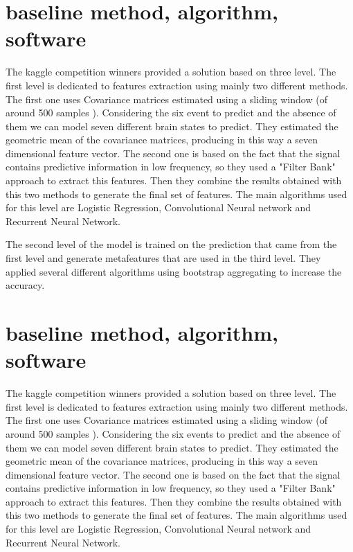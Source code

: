 \documentclass[final,leqno,onefignum,onetabnum]{siamltexmm}
\begin{document}
  \section{baseline method, algorithm, software}
  The kaggle competition winners \cite{kaggle} provided a solution based on three level. The first level is dedicated to features extraction using mainly two different methods. The first one uses Covariance matrices  estimated using a sliding window (of around 500 samples ). Considering the six event to predict and the absence of them we can model seven different brain states to predict. They estimated the geometric mean of the covariance matrices, producing in this way a seven dimensional feature vector. The second one is based on the fact that the signal contains predictive information in low frequency, so they used a  "Filter Bank" approach to extract this features. Then they combine the results obtained with this two methods to generate the final set of features. 
  The main algorithms used for this level are Logistic Regression, Convolutional Neural network and Recurrent Neural Network. 

  The second level of the model is trained on the prediction that came from the first level and generate metafeatures that are used in the third level. They applied several different algorithms using bootstrap aggregating to increase the accuracy.

\section{baseline method, algorithm, software}
The kaggle competition winners \cite{kaggle} provided a solution based on three level. The first level is dedicated to features extraction using mainly two different methods. The first one uses Covariance matrices  estimated using a sliding window (of around 500 samples ). Considering the six events to predict and the absence of them we can model seven different brain states to predict. They estimated the geometric mean of the covariance matrices, producing in this way a seven dimensional feature vector. The second one is based on the fact that the signal contains predictive information in low frequency, so they used a  "Filter Bank" approach to extract this features. Then they combine the results obtained with this two methods to generate the final set of features. 
The main algorithms used for this level are Logistic Regression, Convolutional Neural network and Recurrent Neural Network. 
 
\end{document}
